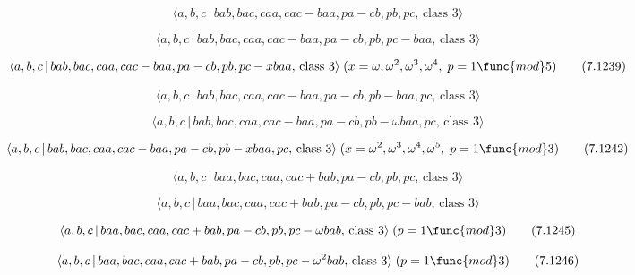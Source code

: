 \documentclass[10pt]{article}
\begin{document}
\begin{equation}
\langle a,b,c\,|\,bab,bac,caa,cac-baa,pa-cb,pb,pc,\,\text{class }3\rangle 
\tag{7.1237}
\end{equation}

\begin{equation}
\langle a,b,c\,|\,bab,bac,caa,cac-baa,pa-cb,pb,pc-baa,\,\text{class }3\rangle
\tag{7.1238}
\end{equation}

\begin{equation}
\langle a,b,c\,|\,bab,bac,caa,cac-baa,pa-cb,pb,pc-xbaa,\,\text{class }%
3\rangle \;(x=\omega ,\omega ^{2},\omega ^{3},\omega ^{4},\;p=1\func{mod}5) 
\tag{7.1239}
\end{equation}

\begin{equation}
\langle a,b,c\,|\,bab,bac,caa,cac-baa,pa-cb,pb-baa,pc,\,\text{class }3\rangle
\tag{7.1240}
\end{equation}

\begin{equation}
\langle a,b,c\,|\,bab,bac,caa,cac-baa,pa-cb,pb-\omega baa,pc,\,\text{class }%
3\rangle  \tag{7.1241}
\end{equation}

\begin{equation}
\langle a,b,c\,|\,bab,bac,caa,cac-baa,pa-cb,pb-xbaa,pc,\,\text{class }%
3\rangle \;(x=\omega ^{2},\omega ^{3},\omega ^{4},\omega ^{5},\;p=1\func{mod}%
3)  \tag{7.1242}
\end{equation}

\begin{equation}
\langle a,b,c\,|\,baa,bac,caa,cac+bab,pa-cb,pb,pc,\,\text{class }3\rangle 
\tag{7.1243}
\end{equation}

\begin{equation}
\langle a,b,c\,|\,baa,bac,caa,cac+bab,pa-cb,pb,pc-bab,\,\text{class }3\rangle
\tag{7.1244}
\end{equation}

\begin{equation}
\langle a,b,c\,|\,baa,bac,caa,cac+bab,pa-cb,pb,pc-\omega bab,\,\text{class }%
3\rangle \;(p=1\func{mod}3)  \tag{7.1245}
\end{equation}

\begin{equation}
\langle a,b,c\,|\,baa,bac,caa,cac+bab,pa-cb,pb,pc-\omega ^{2}bab,\,\text{%
class }3\rangle \;(p=1\func{mod}3)  \tag{7.1246}
\end{equation}
\end{document}
